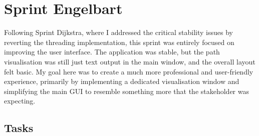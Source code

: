 \newpage

\section{Sprint Engelbart}

Following Sprint Dijkstra, where I addressed the critical stability issues by reverting the threading implementation, this sprint was entirely focused on improving the user interface. The application was stable, but the path visualisation was still just text output in the main window, and the overall layout felt basic. My goal here was to create a much more professional and user-friendly experience, primarily by implementing a dedicated visualisation window and simplifying the main GUI to resemble something more that the stakeholder was expecting.

\subsection{Tasks}

